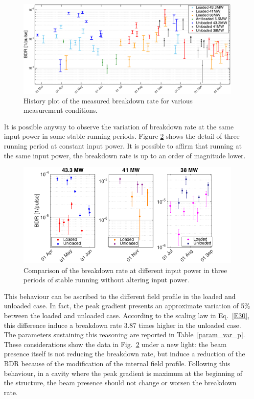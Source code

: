 \begin{landscape}

\begin{figure}[p]
\centering 
\includegraphics[scale=0.61]{pictures/bdr_hist_2.png}
\caption{History plot of the measured breakdown rate for various measurement conditions.}
\label{BDR_history}
\end{figure}
 
\end{landscape}

It is possible anyway to observe the variation of breakdown rate at the same input power in some stable running periods. Figure \ref{BDR_3sectors} shows the detail of three running period at constant input power. It is possible to affirm that running at the same input power, the breakdown rate is up to an order of magnitude lower. 

\begin{figure}[h]
\centering 
\includegraphics[scale=0.5]{pictures/BDR_zooms.png}
\caption{Comparison of the breakdown rate at different input power in three periods of stable running without altering input power.}
\label{BDR_3sectors}
\end{figure}

This behaviour can be ascribed to the different field profile in the loaded and unloaded case. In fact, the peak gradient presents an approximate variation of 5\% between the loaded and unloaded case. According to the scaling law in Eq.~\ref{E30}, this difference induce a breakdown rate 3.87 times higher in the unloaded case. The parameters sustaining this reasoning are reported in Table~\ref{param_var_p}.  These considerations show the data in Fig.~\ref{BDR_3sectors} under a new light: the beam presence itself is not reducing the breakdown rate, but induce a reduction of the BDR because of the modification of the internal field profile. Following this behaviour, in a cavity where the peak gradient is maximum at the beginning of the structure, the beam presence should not change or worsen the breakdown rate.

